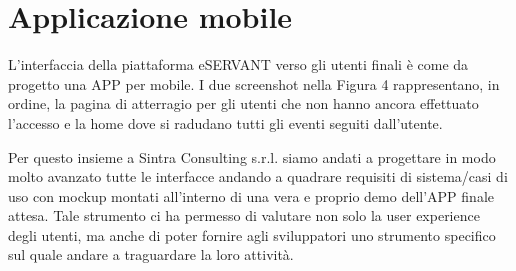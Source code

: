 \chapter{Applicazione mobile}

L’interfaccia della piattaforma eSERVANT verso gli utenti finali è come da progetto una APP per mobile.
I due screenshot nella Figura 4 rappresentano, in ordine, la pagina di atterragio per gli utenti che
non hanno ancora effettuato l'accesso e la home dove si radudano tutti gli eventi seguiti dall'utente.

Per questo insieme a Sintra Consulting s.r.l. siamo andati a progettare in modo molto avanzato tutte le interfacce andando a quadrare requisiti di sistema/casi di uso con mockup montati all’interno di una vera e proprio demo dell’APP finale attesa.
Tale strumento ci ha permesso di valutare non solo la user experience degli utenti, ma anche di poter fornire agli sviluppatori uno strumento specifico sul quale andare a traguardare la loro attività.

